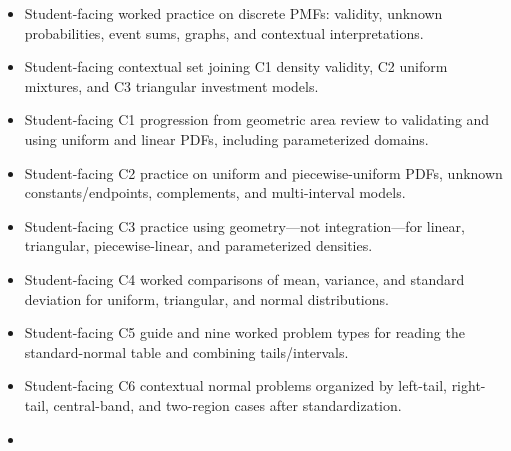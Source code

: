 \begin{itemize}
  \item {}

  Student-facing worked practice on discrete PMFs: validity, unknown probabilities, event sums, graphs, and contextual interpretations.

  \item {}

  Student-facing contextual set joining C1 density validity, C2 uniform mixtures, and C3 triangular investment models.

  \item {}

  Student-facing C1 progression from geometric area review to validating and using uniform and linear PDFs, including parameterized domains.

  \item {}

  Student-facing C2 practice on uniform and piecewise-uniform PDFs, unknown constants/endpoints, complements, and multi-interval models.

  \item {}

  Student-facing C3 practice using geometry—not integration—for linear, triangular, piecewise-linear, and parameterized densities.

  \item {}

  Student-facing C4 worked comparisons of mean, variance, and standard deviation for uniform, triangular, and normal distributions.

  \item {}

  Student-facing C5 guide and nine worked problem types for reading the standard-normal table and combining tails/intervals.

  \item {}

  Student-facing C6 contextual normal problems organized by left-tail, right-tail, central-band, and two-region cases after standardization.

  \item {}


\end{itemize}

